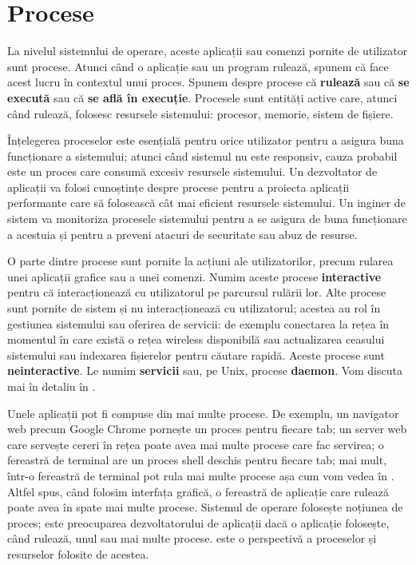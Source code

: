 \chapter{Procese}
\label{chapter:procese}

La nivelul sistemului de operare, aceste aplicații sau comenzi pornite de
utilizator sunt procese. Atunci când o aplicație sau un program rulează, spunem
că face acest lucru în contextul unui proces. Spunem despre procese că
\textbf{rulează} sau că \textbf{se execută} sau că \textbf{se află în execuție}.
Procesele sunt entități active care, atunci când rulează, folosesc resursele
sistemului: procesor, memorie, sistem de fișiere.

Înțelegerea proceselor este esențială pentru orice utilizator pentru a asigura
buna funcționare a sistemului; atunci când sistemul nu este responsiv, cauza
probabil este un proces care consumă excesiv resursele sistemului. Un
dezvoltator de aplicații va folosi cunoștințe despre procese pentru a proiecta
aplicații performante care să folosească cât mai eficient resursele sistemului.
Un inginer de sistem va monitoriza procesele sistemului pentru a se asigura de
buna funcționare a acestuia și pentru a preveni atacuri de securitate sau abuz
de resurse.

O parte dintre procese sunt pornite la acțiuni ale utilizatorilor, precum
rularea unei aplicații grafice sau a unei comenzi. Numim aceste procese
\textbf{interactive} pentru că interacționează cu utilizatorul pe parcursul
rulării lor. Alte procese sunt pornite de sistem și nu interacționează cu
utilizatorul; acestea au rol în gestiunea sistemului sau oferirea de servicii:
de exemplu conectarea la rețea în momentul în care există o rețea wireless
disponibilă sau actualizarea ceasului sistemului sau indexarea fișierelor pentru
căutare rapidă. Aceste procese sunt \textbf{neinteractive}. Le numim
\textbf{servicii} sau, pe Unix, procese \textbf{daemon}. Vom discuta mai în
detaliu în .

Unele aplicații pot fi compuse din mai multe procese. De exemplu, un navigator
web precum Google Chrome pornește un proces pentru fiecare tab; un server web
care servește cereri în rețea poate avea mai multe procese care fac servirea; o
fereastră de terminal are un proces shell deschis pentru fiecare tab;
mai mult, într-o fereastră de terminal pot rula mai multe procese așa cum vom
vedea în .
Altfel spus, când folosim interfața grafică, o fereastră de aplicație care
rulează poate avea în spate mai multe procese. Sistemul de operare folosește
noțiunea de proces; este preocuparea dezvoltatorului de aplicații dacă o
aplicație folosește, când rulează, unul sau mai multe procese.  este o perspectivă a proceselor și resurselor folosite de acestea.

